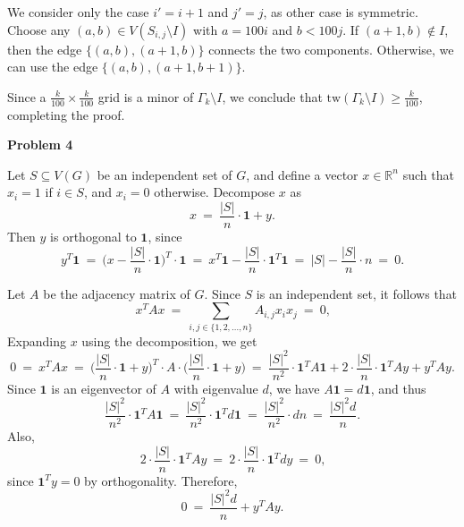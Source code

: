 \documentclass[12pt]{article}
\begin{document}
	We consider only the case \(i' = i + 1\) and \(j' = j\), as other case is
	symmetric. Choose any \((a, b) \in V(S_{i, j} \setminus I)\) with \(a = 100
	i\) and \(b < 100 j\). If \((a + 1, b) \notin I\), then the edge \(\{(a, b),
	(a + 1, b)\}\) connects the two components. Otherwise, we can use the edge
	\(\{(a, b), (a + 1, b + 1)\}\).
	
	\medskip
	
	Since a \(\frac{k}{100} \times \frac{k}{100}\) grid is a minor of
	\(\Gamma_{k} \setminus I\), we conclude that \(\mathrm{tw}(\Gamma_{k}
	\setminus I) \geqslant \frac{k}{100}\), completing the proof.
	
	\newpage
	
	\textbf{Problem 4}
	
	\medskip
	
	Let \(S \subseteq V(G)\) be an independent set of \(G\), and define a vector
	\(x \in \mathbb{R}^{n}\) such that \(x_{i} = 1\) if \(i \in S\), and \(x_{i}
	= 0\) otherwise. Decompose \(x\) as
	\[
		x \ = \ \frac{|S|}{n} \cdot \mathbf{1} + y \text{.}
	\]
	Then \(y\) is orthogonal to \(\mathbf{1}\), since
	\[
		y^{T} \mathbf{1} \ = \ \bigg( x - \frac{|S|}{n} \cdot \mathbf{1}
		\bigg)^{T} \cdot \mathbf{1} \ = \ x^{T} \mathbf{1} - \frac{|S|}{n} \cdot
		\mathbf{1}^{T} \mathbf{1} \ = \ |S| - \frac{|S|}{n} \cdot n \ = \ 0
		\text{.}
	\]
	
	\medskip
	
	Let \(A\) be the adjacency matrix of \(G\). Since \(S\) is an independent
	set, it follows that
	\[
		x^{T} A x \ = \ \sum\limits_{i, j \in \{1, 2, \ldots, n\}} A_{i, j}
		x_{i} x_{j} \ = \ 0 \text{,}
	\]
	Expanding \(x\) using the decomposition, we get
	\[
		0 \ = \ x^{T} A x \ = \ \bigg( \frac{|S|}{n} \cdot \mathbf{1} + y
		\bigg)^{T} \cdot A \cdot \bigg( \frac{|S|}{n} \cdot \mathbf{1} + y
		\bigg) \ = \ \frac{|S|^{2}}{n^{2}} \cdot \mathbf{1}^{T} A \mathbf{1} + 2
		\cdot \frac{|S|}{n} \cdot \mathbf{1}^{T} A y + y^{T} A y \text{.}
	\]
	Since \(\mathbf{1}\) is an eigenvector of \(A\) with eigenvalue \(d\), we
	have \(A \mathbf{1} = d \mathbf{1}\), and thus
	\[
		\frac{|S|^{2}}{n^{2}} \cdot \mathbf{1}^{T} A \mathbf{1} \ = \
		\frac{|S|^{2}}{n^{2}} \cdot \mathbf{1}^{T} d \mathbf{1} \ = \
		\frac{|S|^{2}}{n^{2}} \cdot d n \ = \ \frac{|S|^{2} d}{n} \text{.}
	\]
	Also,
	\[
		2 \cdot \frac{|S|}{n} \cdot \mathbf{1}^{T} A y \ = \ 2 \cdot
		\frac{|S|}{n} \cdot \mathbf{1}^{T} d y \ = \ 0 \text{,}
	\]
	since \(\mathbf{1}^{T} y = 0\) by orthogonality. Therefore,
	\[
		0 \ = \ \frac{|S|^{2} d}{n} + y^{T} A y \text{.}
	\]
	
\end{document}
